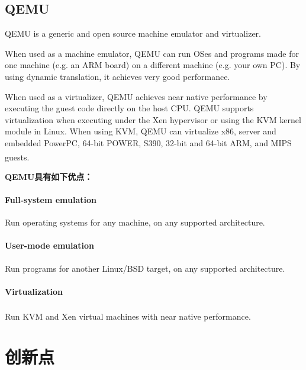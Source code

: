 \documentclass[UTF8,fontset=none,linespread=1.15]{ctexart}
\let\nosupcite\cite
\renewcommand*{\cite}[1]{\textsuperscript{\nosupcite{#1}}}
\begin{document}
\subsection{QEMU}

QEMU is a generic and open source machine emulator and virtualizer.

When used as a machine emulator, QEMU can run OSes and programs made for one machine (e.g. an ARM board) on a different machine (e.g. your own PC). By using dynamic translation, it achieves very good performance.

When used as a virtualizer, QEMU achieves near native performance by executing the guest code directly on the host CPU. QEMU supports virtualization when executing under the Xen hypervisor or using the KVM kernel module in Linux. When using KVM, QEMU can virtualize x86, server and embedded PowerPC, 64-bit POWER, S390, 32-bit and 64-bit ARM, and MIPS guests.\cite{1}

\textbf{QEMU具有如下优点：}

\paragraph{Full-system emulation}Run operating systems for any machine, on any supported architecture.

\paragraph{User-mode emulation}Run programs for another Linux/BSD target, on any supported architecture.

\paragraph{Virtualization}Run KVM and Xen virtual machines with near native performance.\cite{1}

\section{创新点}
\end{document}
